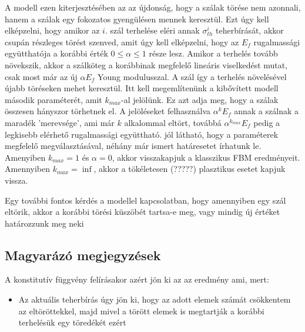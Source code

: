 A modell ezen kiterjesztésében az az újdonság, hogy a szálak törése nem azonnali, hanem a szálak egy fokozatos gyengülésen mennek keresztül. Ezt úgy kell elképzelni, hogy amikor az $i$. szál terhelése eléri annak $\sigma^{i}_{th}$ teherbírását, akkor csupán részleges törést szenved, amit úgy kell elképzelni, hogy az $E_f$ rugalmassági együtthatója a korábbi érték $0\leq\alpha\leq 1$ része lesz. Amikor a terhelés tovább növekszik, akkor a szálköteg a korábbinak megfelelő lineáris viselkedést mutat, csak most már az új $\alpha E_f$ Young modulusszal. A szál így a terhelés növelésével újabb töréseken mehet keresztül. Itt kell megemlítenünk a kibővített modell második paraméterét, amit $k_{max}$-al jelölünk. Ez azt adja meg, hogy a szálak összesen hányszor törhetnek el. A jelöléseket felhasználva $\alpha^{k}E_f$ annak a szálnak a maradék 'merevsége', ami már $k$ alkalommal eltört, továbbá $\alpha^{k_{max}}E_f$ pedig a legkisebb elérhető rugalmassági együttható. jól látható, hogy a paraméterek megfelelő megválasztásával, néhány már ismert határesetet írhatunk le. Amenyiben $k_{max}=1$ és $\alpha=0$, akkor visszakapjuk a klasszikus FBM eredményeit. Amennyiben $k_{max}=\inf$, akkor a tökéletesen (?????) plasztikus esetet kapjuk vissza. 

Egy további fontos kérdés a modellel kapcsolatban, hogy amennyiben egy szál eltörik, akkor a korábbi törési küszöbét tartsa-e meg, vagy mindig új értéket határozzunk meg neki 

\subsection{Magyarázó megjegyzések}
A konstitutív függvény felírásakor azért jön ki az az eredmény ami, mert:
\begin{itemize}
\item Az aktuális teherbírás úgy jön ki, hogy az adott elemek számát csökkentem az eltöröttekkel, majd mivel a törött elemek is megtartják a korábbi terhelésük egy töredékét ezért 
\end{itemize}


